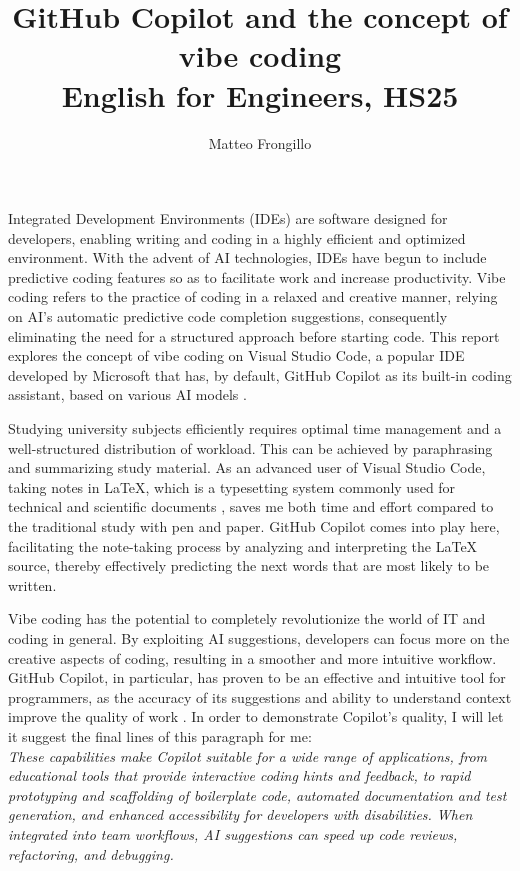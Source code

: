 \documentclass{article}
\title{\textbf{GitHub Copilot and the concept of vibe coding \\ English for Engineers, HS25}}
\author{Matteo Frongillo}
\date{}
\begin{document}
\hypersetup{citecolor=black}
\maketitle
\linespread{1.2}\selectfont

Integrated Development Environments (IDEs) are software designed for developers,
enabling writing and coding in a highly efficient and optimized environment.
With the advent of AI technologies, IDEs have begun to include predictive
coding features so as to facilitate work and increase productivity.
Vibe coding refers to the practice of coding in a relaxed and creative manner,
relying on AI's automatic predictive code completion suggestions, consequently
eliminating the need for a structured approach before starting code.
This report explores the concept of vibe coding on Visual Studio Code, a
popular IDE developed by Microsoft that has, by default, GitHub Copilot as
its built-in coding assistant, based on various AI models \parencite{vscode-overview}.
\vspace*{.25cm}

Studying university subjects efficiently requires optimal time management
and a well-structured distribution of workload. This can be achieved by
paraphrasing and summarizing study material. As an advanced user of
Visual Studio Code, taking notes in LaTeX, which is a typesetting system
commonly used for technical and scientific documents \parencite{latex},
saves me both time and effort compared to the traditional study with pen and paper.
GitHub Copilot comes into play here, facilitating the note-taking process by
analyzing and interpreting the LaTeX source, thereby effectively predicting the
next words that are most likely to be written.
\vspace*{.25cm}

Vibe coding has the potential to completely revolutionize the world of IT and
coding in general. By exploiting AI suggestions, developers can focus more on
the creative aspects of coding, resulting in a smoother and more intuitive
workflow. GitHub Copilot, in particular, has proven to be an effective and
intuitive tool for programmers, as the accuracy of its suggestions and ability
to understand context improve the quality of work \parencite{vscode-inline}.
In order to demonstrate Copilot's quality, I will let it suggest the final
lines of this paragraph for me:\\
\textit{These capabilities make Copilot suitable for a wide range of applications,
from educational tools that provide interactive coding hints and feedback, to
rapid prototyping and scaffolding of boilerplate code, automated documentation
and test generation, and enhanced accessibility for developers with
disabilities. When integrated into team workflows, AI suggestions can speed up
code reviews, refactoring, and debugging.}
\vspace*{.25cm}
\end{document}
